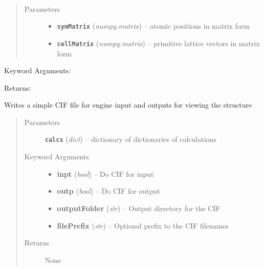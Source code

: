 \documentclass[letterpaper,10pt,english]{sphinxmanual}
\begin{document}

\begin{fulllineitems}
\label{retr:retr.invertZ}~\begin{quote}\begin{description}
\item[{Parameters}] \leavevmode\begin{itemize}
\item {} 
\textbf{\texttt{symMatrix}} (\emph{numpy.matrix}) -- atomic positions in matrix form

\item {} 
\textbf{\texttt{cellMatrix}} (\emph{numpy.matrix}) -- primitive lattice vectors in matrix form

\end{itemize}

\end{description}\end{quote}

Keyword Arguments:

Returns:

\end{fulllineitems}


\begin{fulllineitems}
\label{retr:retr.pw2cif}
Writes a simple CIF file for engine input and outputs for viewing the structure
\begin{quote}\begin{description}
\item[{Parameters}] \leavevmode
\textbf{\texttt{calcs}} (\emph{dict}) -- dictionary of dictionaries of calculations

\item[{Keyword Arguments}] \leavevmode\begin{itemize}
\item {} 
\textbf{inpt} (\emph{bool}) --
Do CIF for input

\item {} 
\textbf{outp} (\emph{bool}) --
Do CIF for output

\item {} 
\textbf{outputFolder} (\emph{str}) --
Output directory for the CIF

\item {} 
\textbf{filePrefix} (\emph{str}) --
Optional prefix to the CIF filenames

\end{itemize}

\item[{Returns}] \leavevmode
None

\end{description}\end{quote}

\end{fulllineitems}
\end{document}
